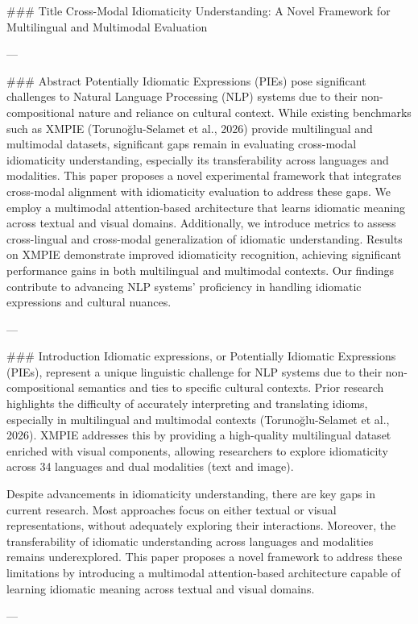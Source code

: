 ### Title
Cross-Modal Idiomaticity Understanding: A Novel Framework for Multilingual and Multimodal Evaluation

---

### Abstract
Potentially Idiomatic Expressions (PIEs) pose significant challenges to Natural Language Processing (NLP) systems due to their non-compositional nature and reliance on cultural context. While existing benchmarks such as XMPIE (Torunoğlu-Selamet et al., 2026) provide multilingual and multimodal datasets, significant gaps remain in evaluating cross-modal idiomaticity understanding, especially its transferability across languages and modalities. This paper proposes a novel experimental framework that integrates cross-modal alignment with idiomaticity evaluation to address these gaps. We employ a multimodal attention-based architecture that learns idiomatic meaning across textual and visual domains. Additionally, we introduce metrics to assess cross-lingual and cross-modal generalization of idiomatic understanding. Results on XMPIE demonstrate improved idiomaticity recognition, achieving significant performance gains in both multilingual and multimodal contexts. Our findings contribute to advancing NLP systems' proficiency in handling idiomatic expressions and cultural nuances.

---

### Introduction
Idiomatic expressions, or Potentially Idiomatic Expressions (PIEs), represent a unique linguistic challenge for NLP systems due to their non-compositional semantics and ties to specific cultural contexts. Prior research highlights the difficulty of accurately interpreting and translating idioms, especially in multilingual and multimodal contexts (Torunoğlu-Selamet et al., 2026). XMPIE addresses this by providing a high-quality multilingual dataset enriched with visual components, allowing researchers to explore idiomaticity across 34 languages and dual modalities (text and image).

Despite advancements in idiomaticity understanding, there are key gaps in current research. Most approaches focus on either textual or visual representations, without adequately exploring their interactions. Moreover, the transferability of idiomatic understanding across languages and modalities remains underexplored. This paper proposes a novel framework to address these limitations by introducing a multimodal attention-based architecture capable of learning idiomatic meaning across textual and visual domains.

---

